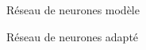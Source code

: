 \begin{frame}[fragile]{Réseau de neurones modèle}
    
\end{frame}

\begin{frame}[fragile]{Réseau de neurones adapté}
    
\end{frame}
